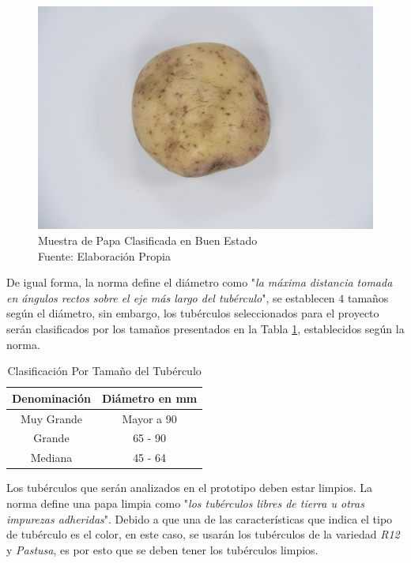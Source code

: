 \begin{figure}[ht]
	\centering
	\includegraphics[scale=0.04]{Figs/good.JPG}
	\caption{Muestra de Papa Clasificada en Buen Estado \\ Fuente: Elaboración Propia}
	\label{fig:good}
\end{figure}

De igual forma, la norma define el diámetro como "\textit{la máxima distancia tomada en ángulos rectos sobre el eje más largo del tubérculo}", se establecen $4$ tamaños según el diámetro, sin embargo, los tubérculos seleccionados para el proyecto serán clasificados por los tamaños presentados en la Tabla \ref{tamano}, establecidos según la norma.\\

\newpage
\begin{table}[ht]
	\centering
	\begin{tabular}{|c|c|}
		\hline
		Denominación & Diámetro en mm \\ \hline
		Muy Grande   & Mayor a 90     \\ \hline
		Grande       & 65 - 90        \\ \hline
		Mediana      & 45 - 64        \\ \hline
	\end{tabular}	
	\caption{Clasificación Por Tamaño del Tubérculo}
	\label{tamano}
\end{table}

Los tubérculos que serán analizados en el prototipo deben estar limpios. La norma define una papa limpia como "\textit{los tubérculos libres de tierra u otras impurezas adheridas}". Debido a que una de las características que indica el tipo de tubérculo es el color, en este caso, se usarán los tubérculos de la variedad \textit{R12} y \textit{Pastusa}, es por esto que se deben tener los tubérculos limpios. 

